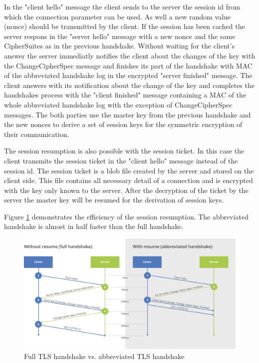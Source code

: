 In the "client hello" message the client sends to the server the session id from which the connection parameter can be used. As well a new random value (nonce) should be transmitted by the client. If the session has been cached the server respons in the "server hello" message with a new nonce and the same CipherSuites as in the previous handshake. Without waiting for the client's answer the server immediatly notifies the client about the changes of the key with the ChangeCipherSpec message and finishes its part of the handshake with MAC of the abbreviated handshake log in the encrypted "server finished" message. The client answers with its notification about the change of the key and completes the handshakes process with the "client finished" message containing a MAC of the whole abbreviated handshake log with the exception of ChangeCipherSpec messages. The both parties use the master key from the previous handshake and the new nonces to derive a set of session keys for the symmetric encryption of their communication.

The session resumption is also possible with the session ticket. In this case the client transmits the session ticket in the "client hello" message instead of the session id. The session ticket is a blob file created by the server and stored on the client side. This file contains all necessary detail of a connection and is encrypted with the key only known to the server. After the decryption of the ticket by the server the master key will be resumed for the derivation of session keys.

Figure \ref{fig:without-with-resume-1_2} demonstrates the efficiency of the session resumption. The abbreviated handshake is almost in half faster than the full handshake.

\begin{figure}[H]
	\centering
		\includegraphics[scale=0.4]{images/without-with-resume-1_2.png}
	\caption{Full TLS handshake vs. abbreviated TLS handshake \cite{cloudflare:resume}}
	\label{fig:without-with-resume-1_2}
\end{figure}

